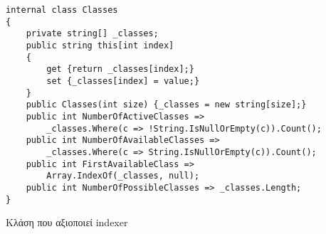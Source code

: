 \begin{listing}[htbp]
\begin{verbatim}
internal class Classes
{
    private string[] _classes;
    public string this[int index]
    {
        get {return _classes[index];}
        set {_classes[index] = value;}
    }
    public Classes(int size) {_classes = new string[size];}
    public int NumberOfActiveClasses => 
        _classes.Where(c => !String.IsNullOrEmpty(c)).Count();
    public int NumberOfAvailableClasses => 
        _classes.Where(c => String.IsNullOrEmpty(c)).Count();
    public int FirstAvailableClass => 
        Array.IndexOf(_classes, null);
    public int NumberOfPossibleClasses => _classes.Length;
}
\end{verbatim}
\caption{Κλάση που αξιοποιεί indexer}
\label{indexersClasses}
\end{listing}